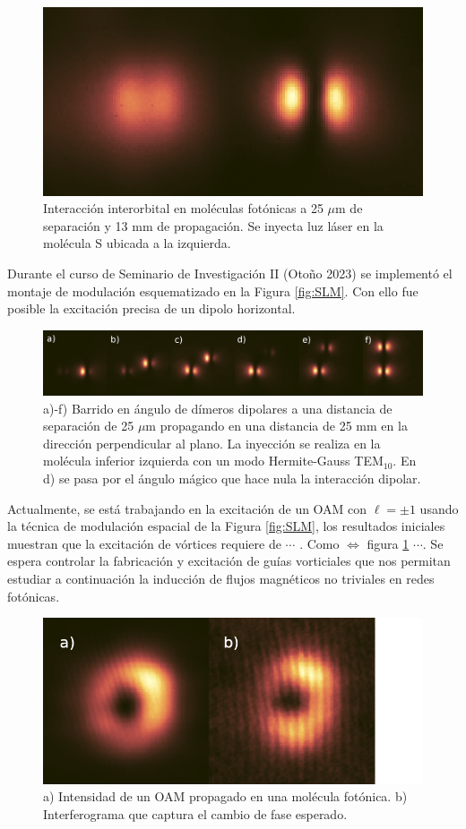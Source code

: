\documentclass{article}
\begin{document}
\begin{figure}[H]
	\centering
	\includegraphics[width=0.5\linewidth]{./media/SPinteraction.png}
	\caption{Interacción interorbital en moléculas fotónicas a 25 $\mu$m de separación y 13 mm de propagación. Se inyecta luz láser en la molécula S ubicada a la izquierda.}
\end{figure}

Durante el curso de Seminario de Investigación II (Otoño 2023) se implementó el montaje de modulación esquematizado en la Figura \ref{fig:SLM}. Con ello fue posible la excitación precisa de un dipolo horizontal.

\begin{figure}[H]
	\centering
	\includegraphics[width=1.0\linewidth]{./media/dipoles.jpg}
	\caption{a)-f) Barrido en ángulo de dímeros dipolares a una distancia de separación de 25 $\mu$m propagando en una distancia de 25 mm en la dirección perpendicular al plano. La inyección se realiza en la molécula inferior izquierda con un modo Hermite-Gauss TEM$_{10}$. En d) se pasa por el ángulo mágico que hace nula la interacción dipolar.}
\end{figure}

Actualmente, se está trabajando en la excitación de un OAM con $\ell = \pm 1$ usando la técnica de modulación espacial de la Figura \ref{fig:SLM}, los resultados iniciales muestran que la excitación de vórtices requiere de $\cdots$ . Como $\iff$ figura \ref{fig:vortex} $\cdots$. Se espera controlar la fabricación y excitación de guías vorticiales que nos permitan estudiar a continuación la inducción de flujos magnéticos no triviales en redes fotónicas.

\begin{figure}[H]
	\centering
	\includegraphics[width=0.7\linewidth]{./media/vortex.png}
	\caption{a) Intensidad de un OAM propagado en una molécula fotónica. b) Interferograma que captura el cambio de fase esperado. \label{fig:vortex}}
\end{figure} 
\end{document}
